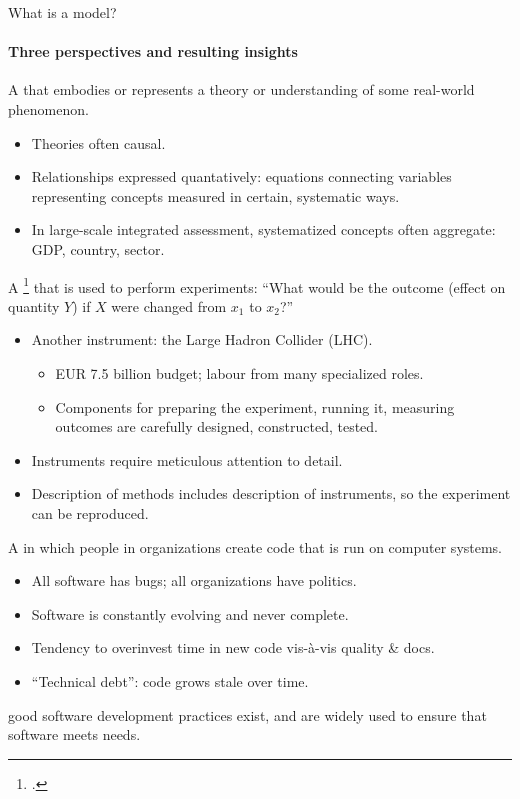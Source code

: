 \begin{frame}[allowframebreaks]{What is a model?}
\framesubtitle{Three perspectives and resulting insights}

A  that embodies or represents a theory or understanding of some real-world phenomenon.

\medskip
\begin{itemize}
  \item Theories often causal.
  \item Relationships expressed quantatively: equations connecting variables representing concepts measured in certain, systematic ways.
  \item In large-scale integrated assessment, systematized concepts often aggregate: GDP, country, sector.
\end{itemize}

\framebreak
A \footcite{omalley-2019} that is used to perform experiments: “What would be the outcome (effect on quantity $Y$) if $X$ were changed from $x_1$ to $x_2$?”

\medskip
\begin{itemize}
  \item Another instrument: the Large Hadron Collider (LHC).
    \begin{itemize}
      \item EUR 7.5 billion budget; labour from many specialized roles.
      \item Components for preparing the experiment, running it, measuring outcomes are carefully designed, constructed, tested.
    \end{itemize}
  \item Instruments require meticulous attention to detail.
  \item Description of methods includes description of instruments, so the experiment can be reproduced.
\end{itemize}

\framebreak
A  in which people in organizations create code that is run on computer systems.

\medskip
\begin{itemize}
  \item All software has bugs; all organizations have politics.
  \item Software is constantly evolving and never complete.
  \item Tendency to overinvest time in new code vis-à-vis quality \& docs.
  \item “Technical debt”: code grows stale over time.
\end{itemize}

\medskip
{} good software development practices exist, and are widely used to ensure that software meets needs.

\end{frame}
